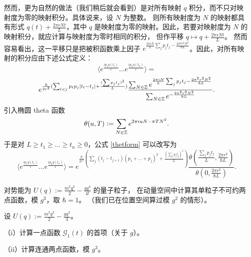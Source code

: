 然而，更为自然的做法（我们稍后就会看到）是对所有映射 $q$ 积分，而不只对映射度为零的映射积分。具体说来，设 $N$ 为整数。
则所有映射度为 $N$ 的映射都具有形式
$q(t)+\frac{2\pi rNt}{L}$，其中 $q$ 是映射度为零的映射。因此，若要对映射度为
$N$ 的映射积分，就应计算与映射度为零时相同的积分，
但作平移 $q\mapsto q+\frac{2\pi r Nt}{L}$。
然而容易看出，这一平移只是把被积函数乘上因子 $e^{\frac{2\pi iN}{L}\sum_j
p_jt_j-\frac{2\pi^2r^2N^2}{\hbar L}}$。因此，对所有映射的积分应由下述公式定义：
$$
\langle e^{\frac{ip_1q(t_1)}{r}}...e^{\frac{ip_nq(t_n)}{r}}\rangle=
$$
\begin{equation}\label{thetform}
e^{\frac{\hbar}{2r^2}(\sum_{l<j} p_\ell p_j |t_\ell-t_j|+\frac{(\sum p_jt_j)^2}{L})}
\frac{\sum_{N\in \Bbb Z}e^{\frac{2\pi iN}{L}\sum_j
p_jt_j-\frac{2\pi^2r^2N^2}{\hbar L}}}
{\sum_{N\in \Bbb Z}e^{-\frac{2\pi^2r^2N^2}{\hbar L}}}.
\end{equation}
引入椭圆 theta 函数
$$
\theta(u,T):=\sum_{N\in \Bbb Z}e^{2\pi iuN-\pi TN^2}.
$$
于是对 $L\ge  t_1\ge...\ge t_n\ge 0$，公式 \eqref{thetform} 
可以改写为
\begin{equation}\label{thetaf}
\langle e^{\frac{ip_1q(t_1)}{r}}...e^{\frac{ip_nq(t_n)}{r}}\rangle
=
e^{\frac{\hbar}{2r^2} (\sum_j (t_{j}-t_{j+1})(p_1+...+p_j)^2+\frac{(\sum_j
p_jt_j)^2}{L})}
\frac{\theta(\frac{\sum_j p_jt_j}{L},\frac{2\pi r^2}{\hbar L})}
{\theta(0,\frac{2\pi r^2}{\hbar L})}.
\end{equation}


\begin{exercise} 对势能为 $U(q):=\frac{m^2q^2}{2}-\frac{gq^4}{4!}$ 的量子粒子，
在动量空间中计算其单粒子不可约两点函数，模 $g^3$，取 $\hbar=1$。
（我们已在位置空间算过模 $g^2$ 的情形）。
\end{exercise}

\begin{exercise} 设 $U(q):=\frac{m^2q^2}{2}-\frac{gq^3}{3}$。

（i）计算一点函数
${\mathcal G}_1(t)$ 的首项（关于 $g$）。

（ii）计算连通两点函数，模 $g^3$。
\end{exercise} 

